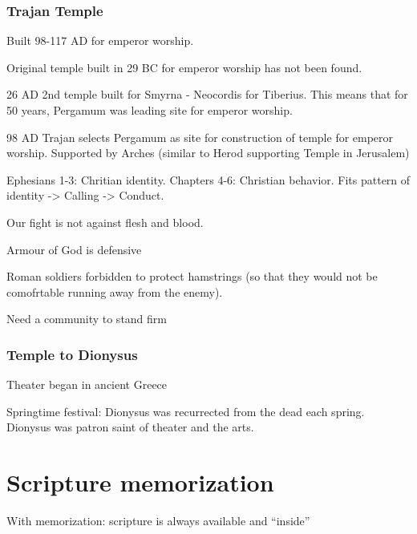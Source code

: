 \documentclass[
]{book}
\begin{document}
\hypertarget{trajan-temple}{%
\subsection{Trajan Temple}\label{trajan-temple}}

Built 98-117 AD for emperor worship.

Original temple built in 29 BC for emperor worship has not been found.

26 AD 2nd temple built for Smyrna - Neocordis for Tiberius. This means that for 50 years, Pergamum was leading site for emperor worship.

98 AD Trajan selects Pergamum as site for construction of temple for emperor worship. Supported by Arches (similar to Herod supporting Temple in Jerusalem)

Ephesians 1-3: Chritian identity. Chapters 4-6: Christian behavior. Fits pattern of identity -\textgreater{} Calling -\textgreater{} Conduct.

Our fight is not against flesh and blood.

Armour of God is defensive

Roman soldiers forbidden to protect hamstrings (so that they would not be comofrtable running away from the enemy).

Need a community to stand firm

\hypertarget{temple-to-dionysus}{%
\subsection{Temple to Dionysus}\label{temple-to-dionysus}}

Theater began in ancient Greece

Springtime festival: Dionysus was recurrected from the dead each spring. Dionysus was patron saint of theater and the arts.

\hypertarget{section}{%
\subsubsection{}\label{section}}

\hypertarget{scripture-memorization}{%
\chapter{Scripture memorization}\label{scripture-memorization}}

With memorization: scripture is always available and ``inside''
\end{document}
